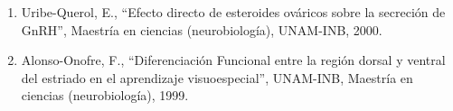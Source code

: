 \begin{enumerate}
\item Uribe-Querol, E., “Efecto directo de esteroides ováricos sobre la secreción de GnRH”, Maestría en ciencias (neurobiología), UNAM-INB, 
2000.

\item Alonso-Onofre, F., “Diferenciación Funcional entre la región dorsal y ventral del estriado en el aprendizaje visuoespecial”, UNAM-INB, 
Maestría en ciencias (neurobiología), 1999.

\end{enumerate}

